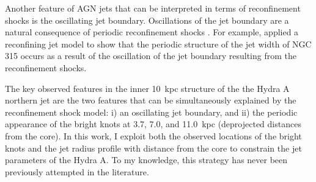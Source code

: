 Another feature of AGN jets that can be interpreted in terms of reconfinement shocks is the oscillating jet boundary. Oscillations of the jet boundary are a natural consequence of periodic reconfinement shocks \citep{prandtl1907}. For example, \citet{sanders83} applied a reconfining jet model to show that the periodic structure of the jet width of NGC 315 occurs as a result of the oscillation of the jet boundary resulting from the reconfinement shocks.

The key observed features in the inner 10~kpc structure of the the Hydra A northern jet are the two features that can be simultaneously explained by the reconfinement shock model: i) an oscillating jet boundary, and ii) the periodic appearance of the bright knots at 3.7, 7.0, and 11.0~kpc (deprojected distances from the core). In this work, I exploit both the observed locations of the bright knots and the jet radius profile with distance from the core to constrain the jet parameters of  the Hydra A. To my knowledge, this strategy has never been previously attempted in the literature.











